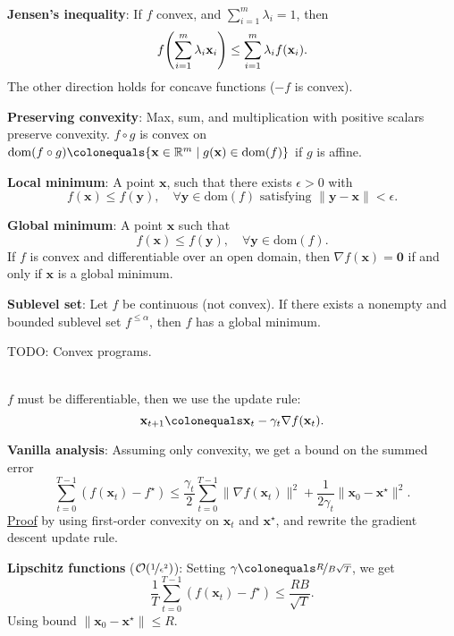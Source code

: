 \documentclass{article}
\newcommand{\lft}{\mathopen{}\mathclose\bgroup\left}
\newcommand{\rgt}{\aftergroup\egroup\right}
\newcommand{\R}{\mathbb{R}}
\renewcommand{\vec}[1]{\mathbf{#1}}
\newcommand{\dom}[1]{\mathrm{dom}(#1)}
\newenvironment{topic}[1]
{\textbf{\sffamily \colorbox{black}{\rlap{\textbf{\textcolor{white}{#1}}}\hspace{\linewidth}\hspace{-2\fboxsep}}} \\ \vspace{0.2cm}}
{}
\begin{document}
\begin{multicols*}{2}
\begin{topic}{2 Convexity}
        \textbf{Jensen's inequality}: If $f$ convex, and $\sum_{i=1}^m \lambda_i = 1$, then \[
            f \lft( \sum_{i=1}^{m} \lambda_i \vec{x}_i \rgt) \leq \sum_{i=1}^{m} \lambda_i f(\vec{x}_i).
        \]
        The other direction holds for concave functions ($-f$ is convex).

        \textbf{Preserving convexity}: Max, sum, and multiplication with positive scalars preserve
        convexity. $f \circ g$ is convex on $\dom{f \circ g} \colonequals \{ \vec{x} \in \R^m \mid
            g(\vec{x}) \in \dom{f} \}$ if $g$ is affine.

        \textbf{Local minimum}: A point $\vec{x}$, such that there exists $\epsilon > 0$ with \[
            f(\vec{x}) \leq f(\vec{y}), \quad \forall \vec{y} \in \dom{f} \text{ satisfying } \| \vec{y} - \vec{x} \| < \epsilon.
        \]

        \textbf{Global minimum}: A point $\vec{x}$ such that \[
            f(\vec{x}) \leq f(\vec{y}), \quad \forall \vec{y} \in \dom{f}.
        \]
        If $f$ is convex and differentiable over an open domain, then $\nabla f(\vec{x}) = \vec{0}$ if and
        only if $\vec{x}$ is a global minimum.

        \textbf{Sublevel set}: Let $f$ be continuous (not convex). If there exists a nonempty and
        bounded sublevel set $f^{\leq \alpha}$, then $f$ has a global minimum.

        TODO: Convex programs.
    \end{topic}

    \begin{topic}{3 Gradient descent}
        $f$ must be differentiable, then we use the update rule: \[
            \vec{x}_{t+1} \colonequals \vec{x}_t - \gamma_t \nabla f(\vec{x}_t).
        \]

        \textbf{Vanilla analysis}: Assuming only convexity, we get a bound on the summed error \[
            \sum_{t=0}^{T-1} (f(\vec{x}_t) - f^\star) \leq \frac{\gamma_t}{2} \sum_{t=0}^{T-1} \| \nabla f(\vec{x}_t) \|^2 + \frac{1}{2 \gamma_t} \| \vec{x}_0 - \vec{x}^\star \|^2.
        \]
        \underline{Proof} by using first-order convexity on $\vec{x}_t$ and $\vec{x}^\star$, and rewrite the gradient
        descent update rule.

        \textbf{Lipschitz functions} ($\mathcal{O}(\nicefrac{1}{\epsilon^2})$): Setting
        $\gamma \colonequals \nicefrac{R}{B \sqrt{T}}$, we get \[
            \frac{1}{T} \sum_{t=0}^{T-1} (f(\vec{x}_t) - f^\star) \leq \frac{RB}{\sqrt{T}}.
        \]
        Using bound $\| \vec{x}_0 - \vec{x}^\star \| \leq R$.
    \end{topic}


\end{multicols*}
\end{document}
